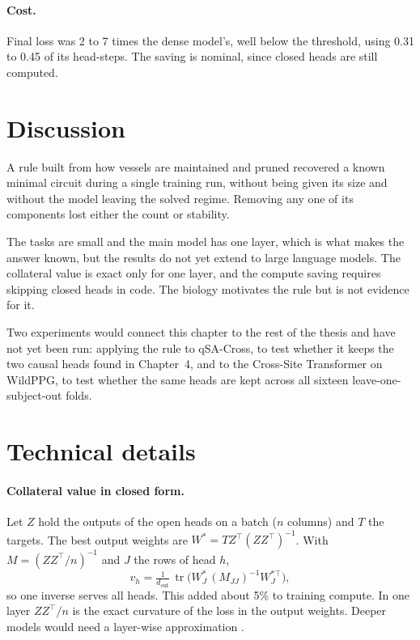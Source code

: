 \documentclass[11pt]{report}
\begin{document}
\paragraph{Cost.} Final loss was 2 to 7 times the dense model's, well below the threshold, using
0.31 to 0.45 of its head-steps. The saving is nominal, since closed heads are still computed.

\section{Discussion}

A rule built from how vessels are maintained and pruned recovered a known minimal circuit during
a single training run, without being given its size and without the model leaving the solved
regime. Removing any one of its components lost either the count or stability.

The tasks are small and the main model has one layer, which is what makes the answer known, but the
results do not yet extend to large language models. The collateral value is exact only for one
layer, and the compute saving requires skipping closed heads in code. The biology motivates the
rule but is not evidence for it.

Two experiments would connect this chapter to the rest of the thesis and have not yet been run:
applying the rule to qSA-Cross, to test whether it keeps the two causal heads found in Chapter~4,
and to the Cross-Site Transformer on WildPPG, to test whether the same heads are kept across all
sixteen leave-one-subject-out folds.

\section{Technical details}
\label{sec:details}

\paragraph{Collateral value in closed form.} Let $Z$ hold the outputs of the open heads on a
batch ($n$ columns) and $T$ the targets. The best output weights are
$W^{*} = T Z^{\top} (ZZ^{\top})^{-1}$. With $M = (ZZ^{\top}/n)^{-1}$ and $J$ the rows of head $h$,
\begin{equation}
v_h = \tfrac{1}{d_{\text{out}}}\,
\operatorname{tr}\!\big( W^{*}_J \,(M_{JJ})^{-1} W^{*\top}_J \big),
\end{equation}
so one inverse serves all heads. This added about 5\% to training compute. In one layer
$ZZ^{\top}/n$ is the exact curvature of the loss in the output weights. Deeper models would need a
layer-wise approximation \cite{ziplm}.
\end{document}
